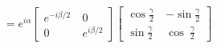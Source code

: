 \documentclass[preview]{standalone}
\begin{document}
\begin{align*}
= e^{i\alpha} \begin{bmatrix} e^{-i\beta/2}\
        & 0 \\[2mm] 0 & e^{i\beta/2} \end{bmatrix} \begin{bmatrix} \cos \frac{\gamma}{2}\
        & -\sin \frac{\gamma}{2} \\[2mm] \sin \frac{\gamma}{2} & \cos\
        \frac{\gamma}{2} \end{bmatrix}
\end{align*}
\end{document}
